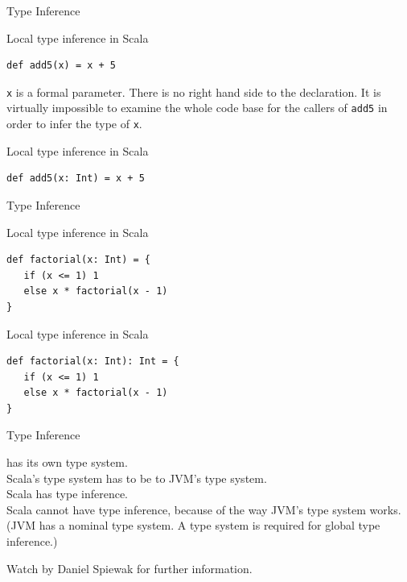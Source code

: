 \begin{frame}[fragile]{Type Inference}
\begin{alertblock}{Local type inference in Scala}
\begin{lstlisting}
def add5(x) = x + 5
\end{lstlisting}
\end{alertblock}
\pause
\lstinline!x! is a formal parameter. There is no right hand side to the
declaration. It is virtually impossible to examine the whole code base for the
callers of \lstinline!add5! in order to infer the type of \lstinline!x!.
\pause
\begin{exampleblock}{Local type inference in Scala}
\begin{lstlisting}
def add5(x: Int) = x + 5
\end{lstlisting}
\end{exampleblock}
\end{frame}

\begin{frame}[fragile]{Type Inference}
\begin{alertblock}{Local type inference in Scala}
\begin{lstlisting}
def factorial(x: Int) = {
   if (x <= 1) 1
   else x * factorial(x - 1)
}
\end{lstlisting}
\end{alertblock}
\pause
\begin{exampleblock}{Local type inference in Scala}
\begin{lstlisting}
def factorial(x: Int): Int = {
   if (x <= 1) 1
   else x * factorial(x - 1)
}
\end{lstlisting}
\end{exampleblock}
\end{frame}

\begin{frame}{Type Inference}
\begin{center}
 has its own type system.\\
Scala's type system has to be  to JVM's type system.\\
Scala has  type inference.\\
Scala \alert{cannot have}  type inference, because of the way
JVM's type system works. (JVM has a \alert{nominal} type system. A
 type system is required for global type inference.)
\end{center}
\begin{center}
Watch  by Daniel Spiewak
 for further information.
\end{center}
\end{frame}

